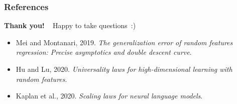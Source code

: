 \begin{frame}
\frametitle{References}

\vspace{2mm}

\begin{block}{}
\centering \textbf{Thank you!} ~ 
Happy to take questions~:) 
\end{block}

\vspace{-1mm}


{
\footnotesize
\begin{itemize}
    \item Mei and Montanari, 2019. \textit{The generalization error of random features regression: Precise asymptotics and double descent curve}.
    \item  Hu and Lu, 2020. \textit{Universality laws for high-dimensional learning with random features}.  
    \item Kaplan et al., 2020. \textit{Scaling laws for neural language models}. 

\end{itemize}}
\end{frame}
